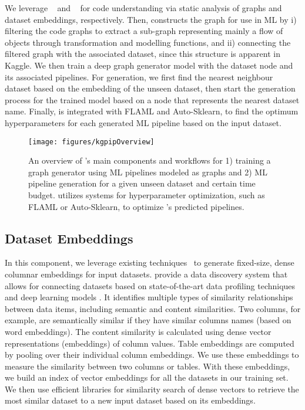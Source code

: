 We leverage ~\cite{graph4code} and ~\cite{kglac} for code understanding via static analysis of graphs and dataset embeddings, respectively. Then, {\sysname} constructs the graph for use in ML by i) filtering the code graphs to extract a sub-graph representing mainly a flow of objects through transformation and modelling functions, and ii) connecting the filtered graph with the associated dataset, since this structure is apparent in Kaggle. We then train a deep graph generator model \cite{deepgmg} with the dataset node and its associated pipelines. For generation, we first find the nearest neighbour dataset based on the embedding of the unseen dataset, then start the generation process for the trained model based on a node that represents the nearest dataset name. Finally, {\sysname} is integrated with FLAML and Auto-Sklearn, to find the optimum hyperparameters for each generated ML pipeline based on the input dataset.

\begin{figure}
\ncp\ncp
 \centering
   \texttt{[image: figures/kgpipOverview]} 
  \ncp\ncp\ncp\ncp\ncp\ncp\ncp
  \caption{An overview of {\sysname}'s main components and workflows for 1) training a graph generator using ML pipelines modeled as graphs and 2) ML pipeline generation for a given unseen dataset and certain time budget. {\sysname} utilizes systems for hyperparameter optimization, such as FLAML or Auto-Sklearn, to optimize {\sysname}'s predicted pipelines.}
  \ncp\ncp\ncp\ncp
  \label{fig:overview}
\end{figure}

\subsection{Dataset Embeddings}
In this component, we leverage existing techniques~\cite{kglac} to generate fixed-size, dense columnar embeddings for input datasets. 
\citet{kglac} provide a data discovery system that allows for connecting datasets based on state-of-the-art data profiling techniques \cite{dataprofiling} and deep learning models \cite{Mueller2019RecognizingVF}. 
It identifies multiple types of similarity relationships between data items, including semantic and content similarities. Two columns, for example, are semantically similar if they have similar columns names (based on word embeddings). The content similarity is calculated using dense vector representations (embeddings) of column values. Table embeddings are computed by pooling over their individual column embeddings.  We use these embeddings to measure the similarity between two columns or tables. 
With these embeddings, we build an index of vector embeddings for all the datasets in our training set. We then use efficient libraries \cite{JDH17} for similarity search of dense vectors to retrieve the most similar dataset to a new input dataset based on its embeddings.



